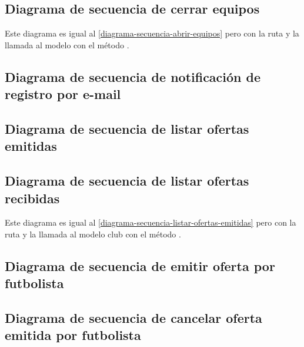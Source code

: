 \subsection{Diagrama de secuencia de cerrar equipos}

Este diagrama es igual al \ref{diagrama-secuencia-abrir-equipos} pero
con la ruta  y la llamada al modelo con
el método .


\subsection{Diagrama de secuencia de notificación de registro por
  e-mail}



\subsection{Diagrama de secuencia de listar ofertas emitidas}


\subsection{Diagrama de secuencia de listar ofertas recibidas}

Este diagrama es igual al
\ref{diagrama-secuencia-listar-ofertas-emitidas} pero con la ruta
 y la llamada al modelo club con el
método .

\subsection{Diagrama de secuencia de emitir oferta por futbolista}


\subsection{Diagrama de secuencia de cancelar oferta emitida por
  futbolista}


